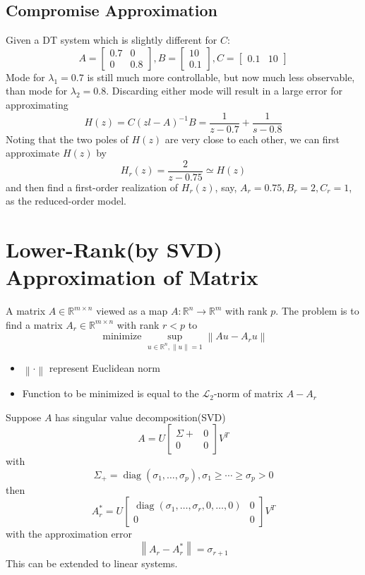 \documentclass[10pt,a4paper,oneside]{article}
\begin{document}
\subsection{Compromise Approximation}
Given a DT system which is slightly different for $C$:
\[
A=\left[\begin{array}{cc}{0.7} & {0} \\ {0} & {0.8}\end{array}\right]
,
B=\left[\begin{array}{l}{10} \\ {0.1}\end{array}\right]
,
C=\left[\begin{array}{ll}{0.1} & {10}\end{array}\right]
\]
Mode for $\lambda_1=0.7$ is still much more controllable, but now much less observable, than mode for $\lambda_2=0.8$. Discarding either mode will result in a large error for approximating
\[
H(z)=C(z l-A)^{-1} B=\frac{1}{z-0.7}+\frac{1}{s-0.8}
\]
Noting that the two poles of $H(z)$ are very close to each other, we can first approximate $H(z)$ by
\[
H_{r}(z)=\frac{2}{z-0.75} \simeq H(z)
\]
and then find a first-order realization of $H_r(z)$, say, $A_r=0.75,B_r=2,C_r=1$, as the reduced-order model.


\section{Lower-Rank(by SVD) Approximation of Matrix}
A matrix $A\in\mathbb{R}^{m\times n}$ viewed as a map $A: \mathbb{R}^n\rightarrow\mathbb{R}^m$ with rank $p$. The problem is to find a matrix $A_r\in\mathbb{R}^{m\times n}$ with rank $r<p$ to
\[
\text { minimize } \sup _{u \in \mathbb{R}^{n},\|u\|=1}\left\|A u-A_{r} u\right\|
\]
\begin{itemize}
\item $\left\|\cdot\right\|$ represent Euclidean norm
\item Function to be minimized is equal to the $\mathcal{L}_2$-norm of matrix $A-A_r$
\end{itemize}
Suppose $A$ has singular value decomposition(SVD)
\[
A=U\left[\begin{array}{cc}{\Sigma+} & {0} \\ {0} & {0}\end{array}\right] V^{T}
\] 
with 
\[
\Sigma_{+}=\operatorname{diag}\left(\sigma_{1}, \ldots, \sigma_{p}\right), \sigma_{1} \geq \cdots \geq \sigma_{p}>0
\]
then
\[
A_{r}^{*}=U\left[\begin{array}{ccc}{\operatorname{diag}\left(\sigma_{1}, \ldots, \sigma_{r}, 0, \ldots, 0\right)} & {0} \\ {0} & {0}\end{array}\right] V^{T}
\]
with the approximation error
\[
\left\|A_{r}-A_{r}^{*}\right\|=\sigma_{r+1}
\]
This can be extended to linear systems.
\end{document}
